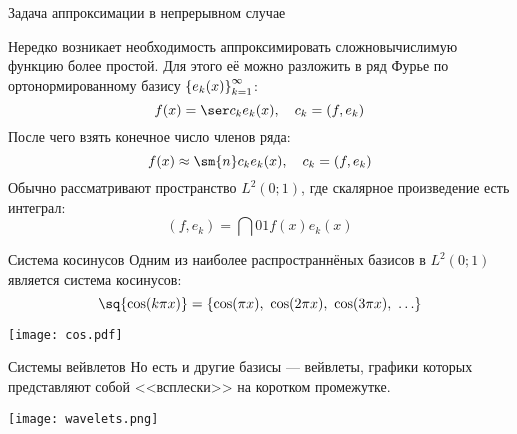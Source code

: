 \documentclass[aspectratio=169, 10pt]{beamer}
\begin{document}
	\begin{frame}{Задача аппроксимации в непрерывном случае}%
		
		Нередко возникает необходимость аппроксимировать сложновычислимую функцию более простой.
		Для этого её можно разложить в ряд Фурье по ортонормированному базису $ \qty{e_k(x)}_{k=1}^{\infty} $:
		\begin{equation}
			f(x) = \ser c_k e_k(x), \quad c_k = (f, e_k)
		\end{equation}
		После чего взять конечное число членов ряда:
		\begin{equation}
			f(x) \approx \sm{n} c_k e_k(x), \quad c_k = (f, e_k)
		\end{equation}
		Обычно рассматривают пространство $ L^2 (0; 1) $, где скалярное произведение есть интеграл:
		\begin{equation}
			(f, e_k) = \dint{0}{1}{f(x) e_k(x)}
		\end{equation}


	\end{frame}

	\begin{frame}{Система косинусов}%
		Одним из наиболее распространнёных базисов в $L^2 (0; 1)$ является система косинусов:
		\begin{equation}
			\sq{\cos(k \pi x)}
			= \qty{\cos(\pi x), \ \cos(2 \pi x), \ \cos(3 \pi x), \ \ldots}
		\end{equation}
		\begin{center}%
			\texttt{[image: cos.pdf]}
		\end{center}
	\end{frame}

	\begin{frame}{Системы вейвлетов}%
		Но есть и другие базисы — вейвлеты, графики которых представляют собой <<всплески>> на коротком промежутке.
		\begin{center}%
			\texttt{[image: wavelets.png]}
		\end{center}
	\end{frame}
\end{document}

